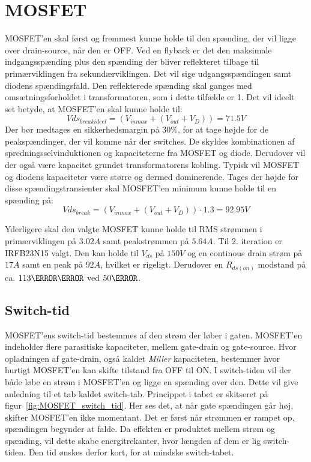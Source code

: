 



\section{MOSFET} \label{MOSFET}
MOSFET'en skal først og fremmest kunne holde til den spænding, der vil ligge over drain-source, når den er OFF. Ved en flyback er det den maksimale indgangsspænding plus den spænding der bliver reflekteret tilbage til primærviklingen fra sekundærviklingen. Det vil sige udgangsspændingen samt diodens spændingsfald. Den reflekterede spænding skal ganges med omsætningsforholdet i transformatoren, som i dette tilfælde er 1. Det vil ideelt set betyde, at MOSFET'en skal kunne holde til:
\begin{equation} \label{Vds_breakideel}
Vds_{breakideel} = (V_{inmax}+(V_{out}+V_D))= 71.5V
\end{equation}
Der bør medtages en sikkerhedsmargin på $30\percent$, for at tage højde for de peakspændinger, der vil komme når der switches. De skyldes kombinationen af spredningsselvinduktionen og kapaciteterne fra MOSFET og diode. Derudover vil der også være kapacitet grundet transformatorens kobling. Typisk vil MOSFET og diodens kapaciteter være større og dermed dominerende. Tages der højde for disse spændingstransienter skal MOSFET'en minimum kunne holde til en spænding på: 
\begin{equation} \label{Vds_break}
Vds_{break} = (V_{inmax}+(V_{out}+V_D)) \cdot 1.3 = 92.95V
\end{equation}

Yderligere skal den valgte MOSFET kunne holde til RMS strømmen i primærviklingen på $3.02A$ samt peakstrømmen på $5.64A$.
Til 2. iteration er IRFB23N15 valgt\cite{IRFB23N15}. Den kan holde til $V_{ds}$ på $150V$ og en continous drain strøm på $17A$ samt en peak på $92A$, hvilket er rigeligt. Derudover en $R_{ds(on)}$ modstand på ca. $113\milli \ohm$ ved $50\degreeCelsius$. 

\subsection{Switch-tid}
MOSFET'ens switch-tid bestemmes af den strøm der løber i gaten. MOSFET'en indeholder flere parasitiske kapaciteter, mellem gate-drain og gate-source. Hvor opladningen af gate-drain, også kaldet \textit{Miller} kapaciteten, bestemmer hvor hurtigt MOSFET'en kan skifte tilstand fra OFF til ON. I switch-tiden vil der både løbe en strøm i MOSFET'en og ligge en spænding over den. Dette vil give anledning til et tab kaldet switch-tab. Princippet i tabet er skitseret på figur~\ref{fig:MOSFET_switch_tid}. Her ses det, at når gate spændingen går høj, skifter MOSFET'en ikke momentant. Det er først når strømmen er rampet op, spændingen begynder at falde. Da effekten er produktet mellem strøm og spænding, vil dette skabe energitrekanter, hvor længden af dem er lig switch-tiden. Den tid ønskes derfor kort, for at mindske switch-tabet. 


